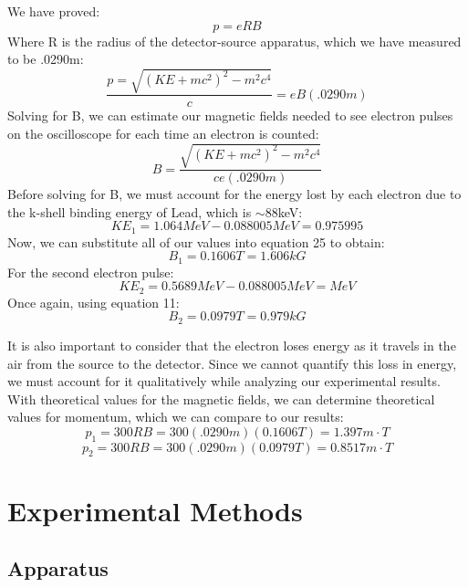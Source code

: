 We have proved:
\begin{equation}p=eRB\end{equation}
Where R is the radius of the detector-source apparatus, which we have measured to be .0290m:
\begin{equation}\frac{p=\sqrt{(KE+mc^2)^2-m^2c^4}}{c}=eB(.0290m)\end{equation}
Solving for B, we can estimate our magnetic fields needed to see electron pulses on the oscilloscope for each time an electron is counted:
\begin{equation}B=\frac{\sqrt{(KE+mc^2)^2-m^2c^4}}{ce(.0290m)}\end{equation}
Before solving for B, we must account for the energy lost by each electron due to the k-shell binding energy of Lead, which is $\sim$88keV:
\begin{equation}KE_1=1.064MeV-0.088005MeV=0.975995\end{equation}
Now, we can substitute all of our values into equation 25 to obtain:
\begin{equation} B_1=0.1606T=1.606kG\end{equation}
For the second electron pulse:
\begin{equation}KE_2=0.5689MeV-0.088005MeV=MeV\end{equation}
Once again, using equation 11:
\begin{equation}B_2=0.0979T=0.979kG\end{equation}

It is also important to consider  that the electron loses energy as it travels in the air from the source to the detector. Since we cannot quantify this loss in energy, we must account for it qualitatively while analyzing our  experimental results. With theoretical values for the magnetic fields, we can determine theoretical values for momentum, which we can compare to our results:
\begin{equation}p_1=300RB=300(.0290m)(0.1606T)=1.397 m\cdot T\end{equation}
\begin{equation}p_2=300RB=300(.0290m)(0.0979T)=0.8517 m\cdot T\end{equation}

\section{Experimental Methods}
\subsection{Apparatus}

